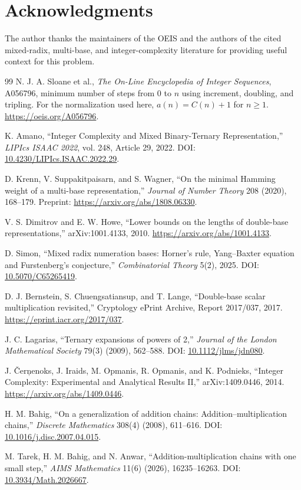 \documentclass[11pt]{article}
\begin{document}
\section*{Acknowledgments}
The author thanks the maintainers of the OEIS and the authors of the cited mixed-radix, multi-base, and integer-complexity literature for providing useful context for this problem.

\begin{thebibliography}{99}
N. J. A. Sloane et al., \emph{The On-Line Encyclopedia of Integer Sequences}, A056796, minimum number of steps from $0$ to $n$ using increment, doubling, and tripling. For the normalization used here, $a(n)=C(n)+1$ for $n\ge1$. \url{https://oeis.org/A056796}.

K. Amano, ``Integer Complexity and Mixed Binary-Ternary Representation,'' \emph{LIPIcs ISAAC 2022}, vol. 248, Article 29, 2022. DOI: \href{https://doi.org/10.4230/LIPIcs.ISAAC.2022.29}{10.4230/LIPIcs.ISAAC.2022.29}.

D. Krenn, V. Suppakitpaisarn, and S. Wagner, ``On the minimal Hamming weight of a multi-base representation,'' \emph{Journal of Number Theory} 208 (2020), 168--179. Preprint: \url{https://arxiv.org/abs/1808.06330}.

V. S. Dimitrov and E. W. Howe, ``Lower bounds on the lengths of double-base representations,'' arXiv:1001.4133, 2010. \url{https://arxiv.org/abs/1001.4133}.

D. Simon, ``Mixed radix numeration bases: Horner's rule, Yang--Baxter equation and Furstenberg's conjecture,'' \emph{Combinatorial Theory} 5(2), 2025. DOI: \href{https://doi.org/10.5070/C65265419}{10.5070/C65265419}.

D. J. Bernstein, S. Chuengsatiansup, and T. Lange, ``Double-base scalar multiplication revisited,'' Cryptology ePrint Archive, Report 2017/037, 2017. \url{https://eprint.iacr.org/2017/037}.

J. C. Lagarias, ``Ternary expansions of powers of 2,'' \emph{Journal of the London Mathematical Society} 79(3) (2009), 562--588. DOI: \href{https://doi.org/10.1112/jlms/jdn080}{10.1112/jlms/jdn080}.

J. \v{C}er\c{n}enoks, J. Iraids, M. Opmanis, R. Opmanis, and K. Podnieks, ``Integer Complexity: Experimental and Analytical Results II,'' arXiv:1409.0446, 2014. \url{https://arxiv.org/abs/1409.0446}.

H. M. Bahig, ``On a generalization of addition chains: Addition--multiplication chains,'' \emph{Discrete Mathematics} 308(4) (2008), 611--616. DOI: \href{https://doi.org/10.1016/j.disc.2007.04.015}{10.1016/j.disc.2007.04.015}.

M. Tarek, H. M. Bahig, and N. Anwar, ``Addition-multiplication chains with one small step,'' \emph{AIMS Mathematics} 11(6) (2026), 16235--16263. DOI: \href{https://doi.org/10.3934/Math.2026667}{10.3934/Math.2026667}.
\end{thebibliography}
\end{document}
